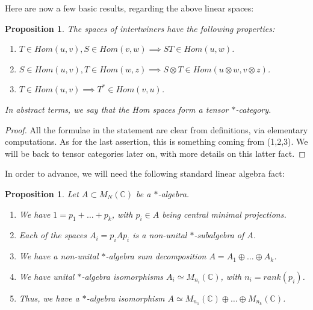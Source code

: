 \documentclass[12pt]{amsbook}
\newtheorem{proposition}[theorem]{Proposition}
\begin{document}
\bigskip

Here are now a few basic results, regarding the above linear spaces:

\begin{proposition}
The spaces of intertwiners have the following properties:
\begin{enumerate}
\item $T\in Hom(u,v),S\in Hom(v,w)\implies ST\in Hom(u,w)$.

\item $S\in Hom(u,v),T\in Hom(w,z)\implies S\otimes T\in Hom(u\otimes w,v\otimes z)$.

\item $T\in Hom(u,v)\implies T^*\in Hom(v,u)$.
\end{enumerate}
In abstract terms, we say that the Hom spaces form a tensor $*$-category.
\end{proposition}

\begin{proof}
All the formulae in the statement are clear from definitions, via elementary computations. As for the last assertion, this is something coming from (1,2,3). We will be back to tensor categories later on, with more details on this latter fact.
\end{proof}

In order to advance, we will need the following standard linear algebra fact:

\begin{proposition}
Let $A\subset M_N(\mathbb C)$ be a $*$-algebra.
\begin{enumerate}
\item We have $1=p_1+\ldots+p_k$, with $p_i\in A$ being central minimal projections.

\item Each of the spaces $A_i=p_iAp_i$ is a non-unital $*$-subalgebra of $A$.

\item We have a non-unital $*$-algebra sum decomposition $A=A_1\oplus\ldots\oplus A_k$.

\item We have unital $*$-algebra isomorphisms $A_i\simeq M_{n_i}(\mathbb C)$, with $n_i=rank(p_i)$.

\item Thus, we have a $*$-algebra isomorphism $A\simeq M_{n_1}(\mathbb C)\oplus\ldots\oplus M_{n_k}(\mathbb C)$.
\end{enumerate}
\end{proposition}
\end{document}
